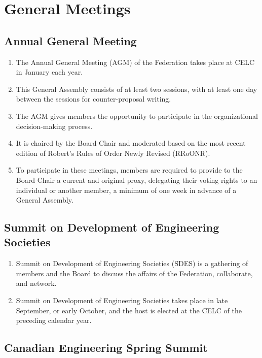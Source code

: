 \section{General Meetings}
\label{general-meetings}

\subsection{Annual General Meeting}
\label{annual-general-meeting}

\begin{enumerate}
 \item
  The Annual General Meeting (AGM) of the Federation takes place at CELC in January each year.
 \item
  This General Assembly consists of at least two sessions, with at least one day between the sessions for counter-proposal writing.
 \item
  The AGM gives members the opportunity to participate in the organizational decision-making process.
 \item
  It is chaired by the Board Chair and moderated based on the most recent edition of Robert's Rules of Order Newly Revised (RRoONR).
 \item
  To participate in these meetings, members are required to provide to the Board Chair a current and original proxy, delegating their voting rights to an individual or another member, a minimum of one week in advance of a General Assembly.
\end{enumerate}

\subsection{Summit on Development of Engineering Societies}
\label{summit-on-development-of-engineering-societies}

\begin{enumerate}
 \item
  Summit on Development of Engineering Societies (SDES) is a gathering of members and the Board to discuss the affairs of the Federation, collaborate, and network.
 \item
  Summit on Development of Engineering Societies takes place in late September, or early October, and the host is elected at the CELC of the preceding calendar year.
\end{enumerate}

\subsection{Canadian Engineering Spring Summit}
\label{canadian-engineering-spring-summit}

